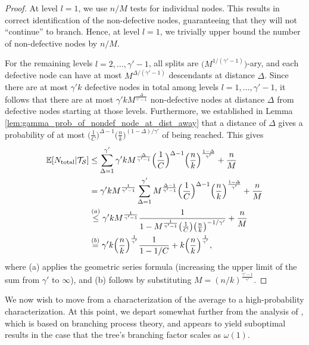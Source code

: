 \begin{proof}
At level $l=1$, we use $n/M$ tests for individual nodes. This results in correct identification of the non-defective nodes, guaranteeing that they will not ``continue'' to branch. Hence, at level $l=1$, we trivially upper bound the number of non-defective nodes by $n/M$.

For the remaining levels $l=2,\dots,\gamma'-1$, all splits are $\big(M^{1/(\gamma'-1)}\big)$-ary, and each defective node can have at most $M^{\Delta/(\gamma'-1)}$ descendants at distance $\Delta$. Since there are at most $\gamma'k$ defective nodes in total among levels $l=1,\dots,\gamma'-1$, it follows that there are at most $\gamma'kM^{\frac{\Delta}{\gamma'-1}}$ non-defective nodes at distance $\Delta$ from defective nodes starting at those levels.  Furthermore, we established in Lemma \ref{lem:gamma_prob_of_nondef_node_at_dist_away} that a distance of $\Delta$ gives a probability of at most $\big(\frac{1}{C}\big)^{\Delta-1}\big(\frac{n}{k}\big)^{(1-\Delta)/\gamma'}$ of being reached. This gives
\begin{align}
    \mathbb{E}[N_{\textup{total}}|\mathcal{T}_{\mathcal{S}}]
    &\leq\sum_{\Delta=1}^{\gamma'}\gamma'kM^{\frac{\Delta}{\gamma'-1}}\Big(\frac{1}{C}\Big)^{\Delta-1}\Big(\frac{n}{k}\Big)^{\frac{1-\Delta}{\gamma'}}
    +\frac{n}{M} \\
    &=\gamma'kM^{\frac{1}{\gamma'-1}}\sum_{\Delta=1}^{\gamma'}M^{\frac{\Delta-1}{\gamma'-1}}\Big(\frac{1}{C}\Big)^{\Delta-1}\Big(\frac{n}{k}\Big)^{\frac{1-\Delta}{\gamma'}}+\frac{n}{M} \\
    &\stackrel{(a)}{\le}\gamma'kM^{\frac{1}{\gamma'-1}}\frac{1}{1-M^{\frac{1}{\gamma'-1}}\big(\frac{1}{C}\big)\big(\frac{n}{k}\big)^{-1/\gamma'}}+\frac{n}{M} \\
    &\stackrel{(b)}{=}\gamma'k\Big(\frac{n}{k}\Big)^{\frac{1}{\gamma'}}\frac{1}{1-1/C}+k\Big(\frac{n}{k}\Big)^{\frac{1}{\gamma'}},
\end{align}
where (a) applies the geometric series formula (increasing the upper limit of the sum from $\gamma'$ to $\infty$), and (b) follows by substituting $M=(n/k)^{\frac{\gamma'-1}{\gamma'}}$.
\end{proof}

We now wish to move from a characterization of the average to a high-probability characterization.  At this point, we depart somewhat further from the analysis of \cite{Eri20}, which is based on branching process theory, and appears to yield suboptimal results in the case that the tree's branching factor scales as $\omega(1)$.

